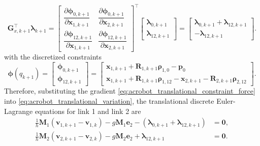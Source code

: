 \begin{equation}
    \bm{G}_{x,k+1}^{\top}\bm{\lambda}_{k+1}
    =
    \begin{bmatrix}
        \dfrac{\partial \bm{\phi}_{0,k+1}}{\partial \bm{x}_{1,k+1}}
        &
        \dfrac{\partial \bm{\phi}_{0,k+1}}{\partial \bm{x}_{2,k+1}}
        \\[0.8em]
        \dfrac{\partial \bm{\phi}_{12,k+1}}{\partial \bm{x}_{1,k+1}}
        &
        \dfrac{\partial \bm{\phi}_{12,k+1}}{\partial \bm{x}_{2,k+1}}
    \end{bmatrix}^{\top}
    \begin{bmatrix}
        \bm{\lambda}_{0,k+1} \\
        \bm{\lambda}_{12,k+1}
    \end{bmatrix}  
    =
    \begin{bmatrix}
        \bm{\lambda}_{0,k+1}+\bm{\lambda}_{12,k+1} \\
        -\bm{\lambda}_{12,k+1}
    \end{bmatrix}.
    \label{eq:acrobot_translational_constraint_force}
\end{equation}
with the discretized constraints
\begin{equation}
    \bm{\phi}(q_{k+1})
    =
    \begin{bmatrix}
        \bm{\phi}_{0,k+1} \\
        \bm{\phi}_{12,k+1}
    \end{bmatrix}
    =
    \begin{bmatrix}
    \bm{x}_{1,k+1}
    +
    \bm{R}_{1,k+1}\bm{\rho}_{1,0}
    -
    \bm{p}_0
    \\
    \bm{x}_{1,k+1}
    +
    \bm{R}_{1,k+1}\bm{\rho}_{1,12}
    -
    \bm{x}_{2,k+1}
    -
    \bm{R}_{2,k+1}\bm{\rho}_{2,12}
    \end{bmatrix}.
    \label{eq:acrobot_discrete_constraints_vector}
\end{equation}
Therefore, substituting the gradient \eqref{eq:acrobot_translational_constraint_force} into \eqref{eq:acrobot_translational_variation}, the translational discrete Euler-Lagrange equations for link 1 and link 2 are
\begin{subequations}
\label{eq:acrobot_translational_del_links}
\begin{align}
    \frac{1}{h}\bm{M}_{1}
    \left(
    \bm{v}_{1,k+1}
    -
    \bm{v}_{1,k}
    \right)
    -
    g\bm{M}_{1}\bm{e}_{2}
    -
    \left(
    \bm{\lambda}_{0,k+1}
    +
    \bm{\lambda}_{12,k+1}
    \right)
    &=
    \bm{0},
    \label{eq:acrobot_translational_del_link_1}
    \\
    \frac{1}{h}\bm{M}_{2}
    \left(
    \bm{v}_{2,k+1}
    -
    \bm{v}_{2,k}
    \right)
    -
    g\bm{M}_{2}\bm{e}_{2}
    +
    \bm{\lambda}_{12,k+1}
    &=
    \bm{0}.
    \label{eq:acrobot_translational_del_link_2}
\end{align}
\end{subequations}

